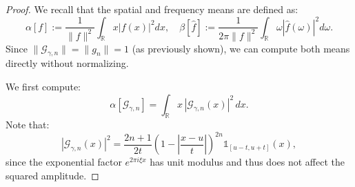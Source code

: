 \documentclass[preprint,hidelinks,authoryear]{elsarticle}
\theoremstyle{plain}
\theoremstyle{definition}
\theoremstyle{remark}
\begin{document}
\begin{proof}
    We recall that the spatial and frequency means are defined as:
$$
\alpha[f] := \frac{1}{\|f\|^2} \int_{\mathbb{R}} x |f(x)|^2 dx, \quad \beta[\hat{f}] := \frac{1}{2\pi \|f\|^2} \int_{\mathbb{R}} \omega |\hat{f}(\omega)|^2 d\omega.
$$
Since $ \|\mathcal{G}_{\gamma,n}\|=\|g_{n}\| = 1 $ (as previously shown), we can compute both means directly without normalizing.


We first compute:
$$
\alpha[\mathcal{G}_{\gamma,n}] = \int_{\mathbb{R}} x\, |\mathcal{G}_{\gamma,n}(x)|^2 \, dx.
$$
Note that:
$$
|\mathcal{G}_{\gamma,n}(x)|^2 = \frac{2n+1}{2t} \left(1 - \left| \frac{x - u}{t} \right| \right)^{2n} \mathds{1}_{[u - t, u + t]}(x),
$$
since the exponential factor $ e^{2\pi i \xi x} $ has unit modulus and thus does not affect the squared amplitude.


\end{proof}
\end{document}
